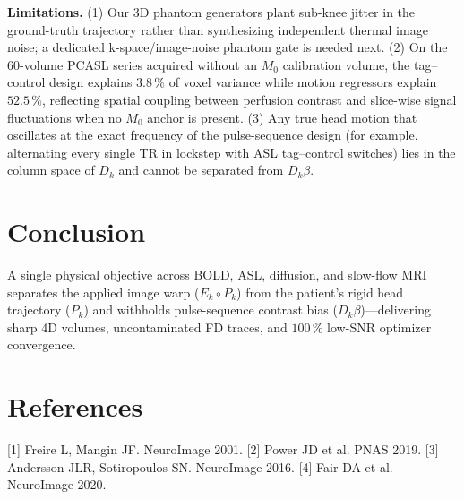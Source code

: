 \documentclass[11pt]{article}
\begin{document}
\textbf{Limitations.}
(1) Our 3D phantom generators plant sub-knee jitter in the ground-truth trajectory rather than synthesizing independent thermal image noise; a dedicated k-space/image-noise phantom gate is needed next.
(2) On the 60-volume PCASL series acquired without an $M_0$ calibration volume, the tag--control design explains $3.8\,\%$ of voxel variance while motion regressors explain $52.5\,\%$, reflecting spatial coupling between perfusion contrast and slice-wise signal fluctuations when no $M_0$ anchor is present.
(3) Any true head motion that oscillates at the exact frequency of the pulse-sequence design (for example, alternating every single TR in lockstep with ASL tag--control switches) lies in the column space of $D_k$ and cannot be separated from $D_k\beta$.

\section*{Conclusion}

A single physical objective across BOLD, ASL, diffusion, and slow-flow MRI separates the applied image warp ($E_k \circ P_k$) from the patient's rigid head trajectory ($P_k$) and withholds pulse-sequence contrast bias ($D_k\beta$)—delivering sharp 4D volumes, uncontaminated FD traces, and $100\,\%$ low-SNR optimizer convergence.

\section*{References}

[1] Freire L, Mangin JF. NeuroImage 2001. [2] Power JD et al. PNAS 2019. [3] Andersson JLR, Sotiropoulos SN. NeuroImage 2016. [4] Fair DA et al. NeuroImage 2020.
\end{document}
